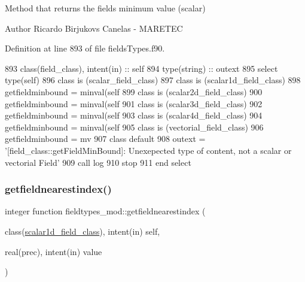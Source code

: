 Method that returns the field\textquotesingle{}s minimum value (scalar) 

\begin{DoxyAuthor}{Author}
Ricardo Birjukovs Canelas -\/ M\+A\+R\+E\+T\+EC 
\end{DoxyAuthor}


Definition at line 893 of file fields\+Types.\+f90.


\begin{DoxyCode}
893     \textcolor{keywordtype}{class}(field\_class), \textcolor{keywordtype}{intent(in)} :: self
894     \textcolor{keywordtype}{type}(string) :: outext
895     \textcolor{keywordflow}{select type}(self)
896 \textcolor{keywordflow}{    class is} (scalar\_field\_class)
897 \textcolor{keywordflow}{    class is} (scalar1d\_field\_class)
898         getfieldminbound = minval(self%
899 \textcolor{keywordflow}{    class is} (scalar2d\_field\_class)
900         getfieldminbound = minval(self%
901 \textcolor{keywordflow}{    class is} (scalar3d\_field\_class)
902         getfieldminbound = minval(self%
903 \textcolor{keywordflow}{    class is} (scalar4d\_field\_class)
904         getfieldminbound = minval(self%
905 \textcolor{keywordflow}{    class is} (vectorial\_field\_class)
906         getfieldminbound = mv
907 \textcolor{keywordflow}{        class default}
908         outext = \textcolor{stringliteral}{'[field\_class::getFieldMinBound]: Unexepected type of content, not a scalar or vectorial
       Field'}
909         \textcolor{keyword}{call }log%
910         stop
911 \textcolor{keywordflow}{    end select}
\end{DoxyCode}
\mbox{\label{namespacefieldtypes__mod_afad53b4aed8733a243672c2dc19f62f3}} 
\subsubsection{\texorpdfstring{getfieldnearestindex()}{getfieldnearestindex()}}
{\footnotesize\ttfamily integer function fieldtypes\+\_\+mod\+::getfieldnearestindex (\begin{DoxyParamCaption}\item[{class(\mbox{\hyperlink{structfieldtypes__mod_1_1scalar1d__field__class}{scalar1d\+\_\+field\+\_\+class}}), intent(in)}]{self,  }\item[{real(prec), intent(in)}]{value }\end{DoxyParamCaption})\hspace{0.3cm}{\ttfamily [private]}}



